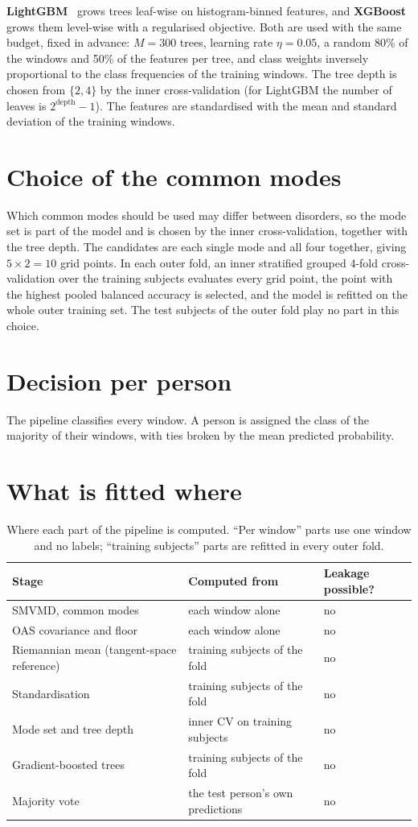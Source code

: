 \textbf{LightGBM}~\cite{ke2017} grows trees leaf-wise on histogram-binned features, and
\textbf{XGBoost}~\cite{chen2016} grows them level-wise with a regularised objective. Both are
used with the same budget, fixed in advance: $M=300$ trees, learning rate $\eta=0.05$, a random
80\% of the windows and 50\% of the features per tree, and class weights inversely proportional
to the class frequencies of the training windows. The tree depth is chosen from $\{2, 4\}$ by the
inner cross-validation (for LightGBM the number of leaves is $2^{\text{depth}}-1$). The features
are standardised with the mean and standard deviation of the training windows.

\section{Choice of the common modes}
Which common modes should be used may differ between disorders, so the mode set is part of the
model and is chosen by the inner cross-validation, together with the tree depth. The candidates
are each single mode and all four together, giving $5\times 2=10$ grid points. In each outer
fold, an inner stratified grouped 4-fold cross-validation over the training subjects evaluates
every grid point, the point with the highest pooled balanced accuracy is selected, and the model
is refitted on the whole outer training set. The test subjects of the outer fold play no part in
this choice.

\section{Decision per person}
The pipeline classifies every window. A person is assigned the class of the majority of their
windows, with ties broken by the mean predicted probability.

\section{What is fitted where}
\begin{table}[H]
\caption{Where each part of the pipeline is computed. ``Per window'' parts use one window and no
labels; ``training subjects'' parts are refitted in every outer fold.}
\label{tab:fitted}\centering\small
\begin{tabular}{lll}
\hline
Stage & Computed from & Leakage possible? \\
\hline
SMVMD, common modes & each window alone & no \\
OAS covariance and floor & each window alone & no \\
Riemannian mean (tangent-space reference) & training subjects of the fold & no \\
Standardisation & training subjects of the fold & no \\
Mode set and tree depth & inner CV on training subjects & no \\
Gradient-boosted trees & training subjects of the fold & no \\
Majority vote & the test person's own predictions & no \\
\hline
\end{tabular}
\end{table}


